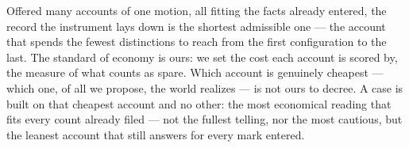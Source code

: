 %
%
%
%

\noindent Offered many accounts of one motion, all fitting the facts already entered, the record the
instrument lays down is the shortest admissible one --- the account that spends the fewest distinctions to
reach from the first configuration to the last. The standard of economy is ours: we set the cost each account
is scored by, the measure of what counts as spare. Which account is genuinely cheapest --- which one, of all we
propose, the world realizes --- is not ours to decree. A case is built on that cheapest account and no other:
the most economical reading that fits every count already filed --- not the fullest telling, nor the most
cautious, but the leanest account that still answers for every mark entered.


